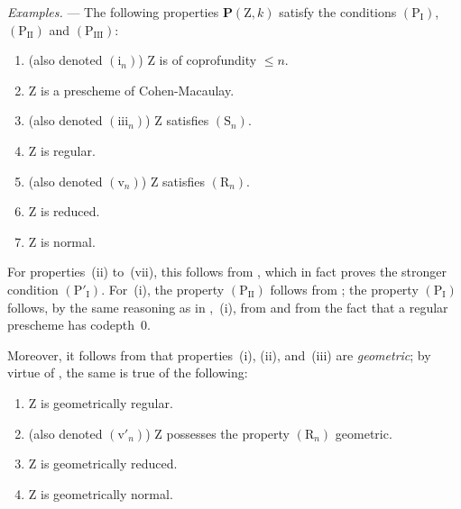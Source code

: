 \begin{env}[7.3.8]
\label{IV.7.3.8}
\emph{Examples.} ---
The following properties $\boldsymbol{P}(\mathrm{Z},k)$ satisfy the conditions $(\mathrm{P_I})$, $(\mathrm{P_{II}})$ and $(\mathrm{P_{III}})$:
\begin{enumerate}[label=(\roman*)]
  \item (also denoted $(\mathrm{i}_n)$) $\mathrm{Z}$ is of coprofundity $\leqslant n$.
  \item $\mathrm{Z}$ is a prescheme of Cohen-Macaulay.
  \item (also denoted $(\mathrm{iii}_n)$) $\mathrm{Z}$ satisfies $(\mathrm{S}_n)$.
  \item $\mathrm{Z}$ is regular.
  \item (also denoted $(\mathrm{v}_n)$) $\mathrm{Z}$ satisfies $(\mathrm{R}_n)$.
  \item $\mathrm{Z}$ is reduced.
  \item $\mathrm{Z}$ is normal.
\end{enumerate}
For properties~(ii) to~(vii), this follows from , which in fact proves the stronger condition $(\mathrm{P}'_\mathrm{I})$.
For~(i), the property $(\mathrm{P_{II}})$ follows from ; the property $(\mathrm{P_I})$ follows, by the same reasoning as in ,~(i), from  and from the fact that a regular prescheme has codepth~$0$.

Moreover, it follows from  that properties~(i), (ii), and~(iii) are \emph{geometric}; by virtue of , the same is true of the following:
\begin{enumerate}[label=(\roman*')]
  \item[(iv')] $\mathrm{Z}$ is geometrically regular.
  \item[(v')] (also denoted $(\mathrm{v}'_n)$) $\mathrm{Z}$ possesses the property $(\mathrm{R}_n)$ geometric.
  \item[(vi')] $\mathrm{Z}$ is geometrically reduced.
  \item[(vii')] $\mathrm{Z}$ is geometrically normal.
\end{enumerate}
\end{env}

